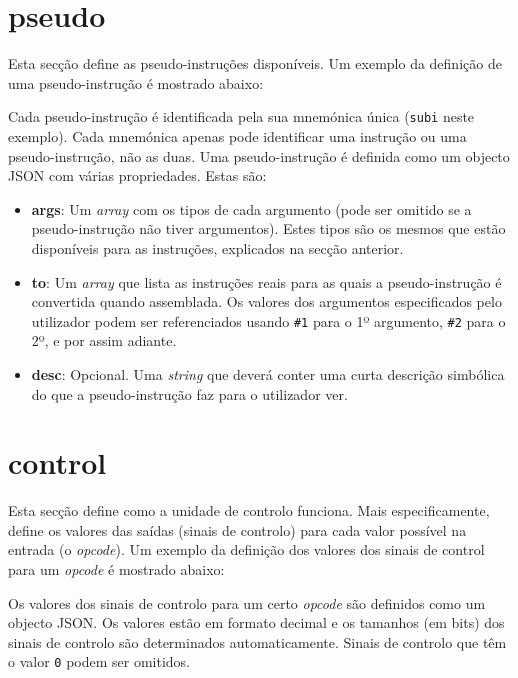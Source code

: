 \documentclass[11pt,a4paper,twoside,titlepage]{report}
\begin{document}
\section{pseudo}

Esta secção define as pseudo-instruções disponíveis.
Um exemplo da definição de uma pseudo-instrução é mostrado abaixo:



Cada pseudo-instrução é identificada pela sua mnemónica única (\verb+subi+
neste exemplo). Cada mnemónica apenas pode identificar uma instrução ou uma
pseudo-instrução, não as duas.
Uma pseudo-instrução é definida como um objecto JSON com várias propriedades.
Estas são:

\begin{itemize}
	\item \textbf{args}: Um \emph{array} com os tipos de cada argumento (pode ser
		omitido se a pseudo-instrução não tiver argumentos). Estes tipos são os
		mesmos que estão disponíveis para as instruções, explicados na secção
		anterior.
	\item \textbf{to}: Um \emph{array} que lista as instruções reais para as quais
		a pseudo-instrução é convertida quando assemblada. Os valores dos argumentos
		especificados pelo utilizador podem ser referenciados usando \verb+#1+ para
		o 1º argumento, \verb+#2+ para o 2º, e por assim adiante.
	\item \textbf{desc}: Opcional. Uma \emph{string} que deverá conter uma
		curta descrição simbólica do que a pseudo-instrução faz para o utilizador 
		ver.
\end{itemize}


\section{control}

Esta secção define como a unidade de controlo funciona. Mais especificamente,
define os valores das saídas (sinais de controlo) para cada valor possível na
entrada (o \emph{opcode}).
Um exemplo da definição dos valores dos sinais de control para um \emph{opcode}
é mostrado abaixo:



Os valores dos sinais de controlo para um certo \emph{opcode} são definidos como
um objecto JSON. Os valores estão em formato decimal e os tamanhos (em bits) dos
sinais de controlo são determinados automaticamente.
Sinais de controlo que têm o valor \verb+0+ podem ser omitidos.
\end{document}
